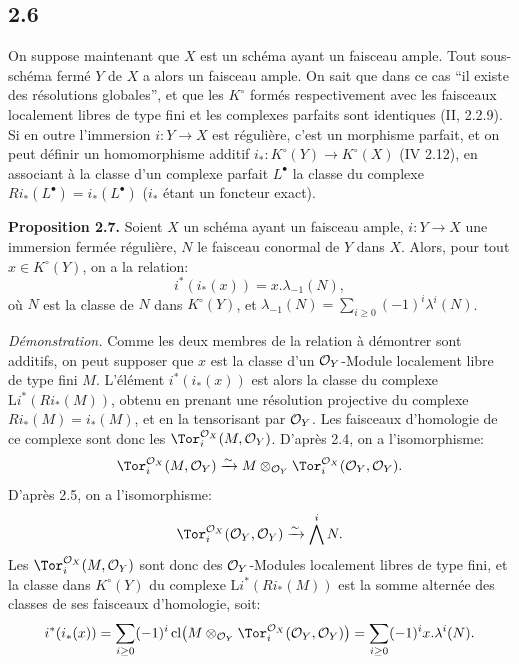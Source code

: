 \subsection*{2.6}
On suppose maintenant que \(X\) est un schéma ayant un faisceau ample. Tout sous-schéma fermé \(Y\) de \(X\) a alors un faisceau ample. On sait que dans ce cas ``il existe des résolutions globales'', et que les \(K^\circ\) formés respectivement avec les faisceaux localement libres de type fini et les complexes parfaits sont identiques (II, 2.2.9). Si en outre l'immersion \(i:Y\to X\) est régulière, c'est un morphisme parfait, et on peut définir un homomorphisme additif \(i_*:K^\circ(Y)\longrightarrow K^\circ(X)\) (IV 2.12), en associant à la classe d'un complexe parfait \(L^\bullet\) la classe du complexe \(Ri_*(L^\bullet)=i_*(L^\bullet)\) (\(i_*\) étant un foncteur exact).

\textbf{Proposition 2.7.} Soient \(X\) un schéma ayant un faisceau ample, \(i:Y\to X\) une immersion fermée régulière, \(N\) le faisceau conormal de \(Y\) dans \(X\). Alors, pour tout \(x\in K^\circ(Y)\), on a la relation:
\begin{equation}\tag{2.7.1}
i^*(i_*(x))=x.\lambda_{-1}(N),
\end{equation}
où \(N\) est la classe de \(N\) dans \(K^\circ(Y)\), et \(\lambda_{-1}(N)=\sum_{i\ge0}(-1)^i\lambda^i(N)\).

\emph{Démonstration.}
Comme les deux membres de la relation à démontrer sont additifs, on peut supposer que \(x\) est la classe d'un \(\mathcal O_Y\)-Module localement libre de type fini \(M\). L'élément \(i^*(i_*(x))\) est alors la classe du complexe \(\mathrm L i^*(Ri_*(M))\), obtenu en prenant une résolution projective du complexe \(Ri_*(M)=i_*(M)\), et en la tensorisant par \(\mathcal O_Y\). Les faisceaux d'homologie de ce complexe sont donc les \(\Tor_i^{\cO_X}(M,\cO_Y)\). D'après 2.4, on a l'isomorphisme:
\[
\Tor_i^{\cO_X}(M,\cO_Y)
\xrightarrow{\sim}
M\otimes_{\cO_Y}\Tor_i^{\cO_X}(\cO_Y,\cO_Y).
\]
D'après 2.5, on a l'isomorphisme:
\[
\Tor_i^{\cO_X}(\cO_Y,\cO_Y)
\xrightarrow{\sim}
\bigwedge^i N.
\]
Les \(\Tor_i^{\cO_X}(M,\cO_Y)\) sont donc des \(\mathcal O_Y\)-Modules localement libres de type fini, et la classe dans \(K^\circ(Y)\) du complexe \(\mathrm L i^*(Ri_*(M))\) est la somme alternée des classes de ses faisceaux d'homologie, soit:
\[
i^*(i_*(x))=\sum_{i\ge0}(-1)^i
\operatorname{cl}\bigl(M\otimes_{\cO_Y}\Tor_i^{\cO_X}(\cO_Y,\cO_Y)\bigr)
=\sum_{i\ge0}(-1)^i x.\lambda^i(N).
\]

